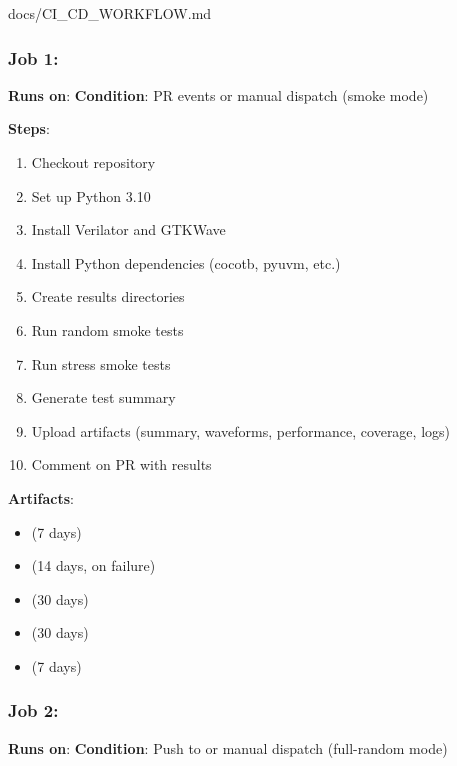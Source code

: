 \begin{relocated}{docs/CI_CD_WORKFLOW.md}
\subsubsection{\texorpdfstring{Job 1: }{Job 1: }}\label{um:flow:ci-cd-workflow:job-1-smoke-test}

\textbf{Runs on}:  \textbf{Condition}: PR events or
manual dispatch (smoke mode)

\textbf{Steps}:

\begin{enumerate}
\def\labelenumi{\arabic{enumi}.}
\tightlist
\item
  Checkout repository
\item
  Set up Python 3.10
\item
  Install Verilator and GTKWave
\item
  Install Python dependencies (cocotb, pyuvm, etc.)
\item
  Create results directories
\item
  Run random smoke tests
\item
  Run stress smoke tests
\item
  Generate test summary
\item
  Upload artifacts (summary, waveforms, performance, coverage, logs)
\item
  Comment on PR with results
\end{enumerate}

\textbf{Artifacts}:

\begin{itemize}
\tightlist
\item
   (7 days)
\item
   (14 days, on failure)
\item
   (30 days)
\item
   (30 days)
\item
   (7 days)
\end{itemize}

\subsubsection{\texorpdfstring{Job 2: }{Job 2: }}\label{um:flow:ci-cd-workflow:job-2-full-random-test}

\textbf{Runs on}:  \textbf{Condition}: Push to
 or manual dispatch (full-random mode)


\end{relocated}
